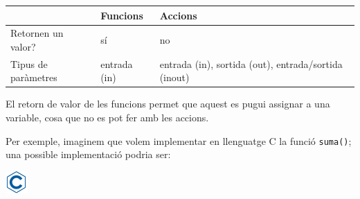 \documentclass[]{book}
\begin{document}
\begin{longtable}[]{@{}lll@{}}
\toprule
\begin{minipage}[b]{0.50\columnwidth}\raggedright
\strut
\end{minipage} & \begin{minipage}[b]{0.22\columnwidth}\raggedright
Funcions\strut
\end{minipage} & \begin{minipage}[b]{0.19\columnwidth}\raggedright
Accions\strut
\end{minipage}\tabularnewline
\midrule
\endhead
\begin{minipage}[t]{0.50\columnwidth}\raggedright
Retornen un valor?\strut
\end{minipage} & \begin{minipage}[t]{0.22\columnwidth}\raggedright
sí\strut
\end{minipage} & \begin{minipage}[t]{0.19\columnwidth}\raggedright
no\strut
\end{minipage}\tabularnewline
\begin{minipage}[t]{0.50\columnwidth}\raggedright
Tipus de paràmetres\strut
\end{minipage} & \begin{minipage}[t]{0.22\columnwidth}\raggedright
entrada (in)\strut
\end{minipage} & \begin{minipage}[t]{0.19\columnwidth}\raggedright
entrada (in), sortida (out), entrada/sortida (inout)\strut
\end{minipage}\tabularnewline
\bottomrule
\end{longtable}

El retorn de valor de les funcions permet que aquest es pugui assignar a una variable, cosa que no es pot fer amb les accions.

Per exemple, imaginem que volem implementar en llenguatge C la funció \texttt{suma()}; una possible implementació podria ser:

\includegraphics{./img/c.png}
\end{document}
